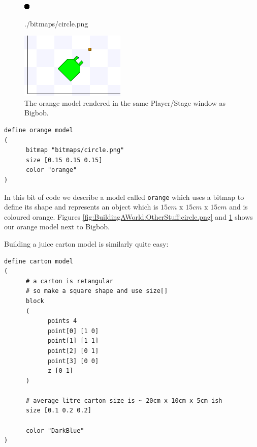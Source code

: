 \documentclass[a4paper]{report}
\newcommand{\plst}{Player/Stage\xspace}
\begin{document}
\begin{figure}
	\centering
	\begin{minipage}[c]{0.2\linewidth}
		\centering
		\includegraphics{./pics/oranges_box/circle.png} 
		\caption{./bitmaps/circle.png}
		\label{fig:BuildingAWorld:OtherStuff:circle.png}	
	\end{minipage}%
	\hspace{0.1\linewidth}
	\begin{minipage}[c]{0.6\linewidth}
		\centering
		\includegraphics[width=\linewidth]{./pics/oranges_box/orange_and_bob.png} 
		\caption{The orange model rendered in the same \plst window as Bigbob.}
		\label{fig:BuildingAWorld:OtherStuff:OrangeAndBob}
	\end{minipage}	
\end{figure}


\begin{verbatim}
define orange model
(
      bitmap "bitmaps/circle.png"
      size [0.15 0.15 0.15]
      color "orange"
)
\end{verbatim}

In this bit of code we describe a model called \verb|orange| which uses a bitmap to define its shape and represents an object which is $15cm$ x $15cm$ x $15cm$ and is coloured orange. Figures \ref{fig:BuildingAWorld:OtherStuff:circle.png} and \ref{fig:BuildingAWorld:OtherStuff:OrangeAndBob} shows our orange model next to Bigbob.

Building a juice carton model is similarly quite easy:

\begin{verbatim}
define carton model
(
      # a carton is retangular
      # so make a square shape and use size[]
      block
      (
            points 4
            point[0] [1 0]
            point[1] [1 1]
            point[2] [0 1]
            point[3] [0 0]
            z [0 1]
      )

      # average litre carton size is ~ 20cm x 10cm x 5cm ish
      size [0.1 0.2 0.2]

      color "DarkBlue"
)
\end{verbatim}
\end{document}
